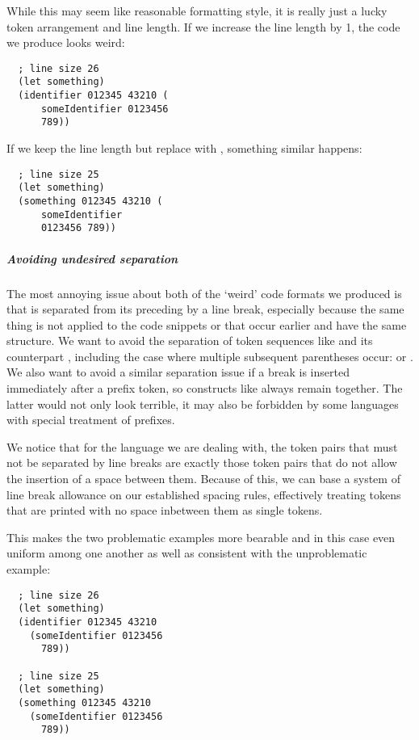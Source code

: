 While this may seem like reasonable formatting style,
it is really just a lucky token arrangement and line length.
If we increase the line length by 1, the code we produce looks weird:
\begin{verbatim}
  ; line size 26
  (let something)
  (identifier 012345 43210 (
      someIdentifier 0123456
      789))
\end{verbatim}
If we keep the line length but replace 
with , something similar happens:
\begin{verbatim}
  ; line size 25
  (let something)
  (something 012345 43210 (
      someIdentifier
      0123456 789))
\end{verbatim}

\subparagraph{Avoiding undesired separation}
The most annoying issue about both of the `weird' code formats we produced is that
 is separated from its preceding  by a line break,
especially because the same thing is not applied to the code snippets
 or  that occur earlier and have the same structure.
We want to avoid the separation of token sequences like 
and its counterpart , including the case where multiple subsequent
parentheses occur:  or .
We also want to avoid a similar separation issue if a break
is inserted immediately after a prefix token,
so constructs like  always remain together.
The latter would not only look terrible, it may also be forbidden by some languages
with special treatment of prefixes.

We notice that for the language we are dealing with,
the token pairs that must not be separated by line breaks
are exactly those token pairs that do not allow the insertion of a space between them.
Because of this, we can base a system of line break allowance on our established spacing rules,
effectively treating tokens that are printed with no space inbetween them as single tokens.

This makes the two problematic examples more bearable
and in this case even uniform among one another
as well as consistent with the unproblematic example:
\begin{verbatim}
  ; line size 26
  (let something)
  (identifier 012345 43210
    (someIdentifier 0123456
      789))

  ; line size 25
  (let something)
  (something 012345 43210
    (someIdentifier 0123456
      789))
\end{verbatim}

